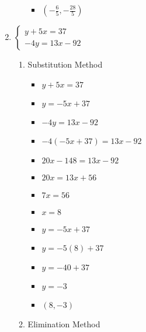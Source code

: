 \begin{enumerate}
\begin{enumerate}
\begin{itemize}
    \item {\Large $\left(-\frac{6}{5},-\frac{28}{5}\right)$}
    \end{itemize}
  \end{enumerate}
\item $\left\{ \begin{array}{l}
      y+5x=37 \\
      -4y=13x-92 \end{array} \right.$
  \begin{enumerate}
  \item Substitution Method
    \begin{itemize}
    \item $y+5x=37$
    \item $y=-5x+37$
    \item $-4y=13x-92$
    \item $-4(-5x+37)=13x-92$
    \item $20x-148=13x-92$
    \item $20x=13x+56$
    \item $7x=56$
    \item $x=8$
    \item $y=-5x+37$
    \item $y=-5(8)+37$
    \item $y=-40+37$
    \item $y=-3$
    \item $(8,-3)$
    \end{itemize}
  \item Elimination Method
\end{enumerate}
\end{enumerate}
